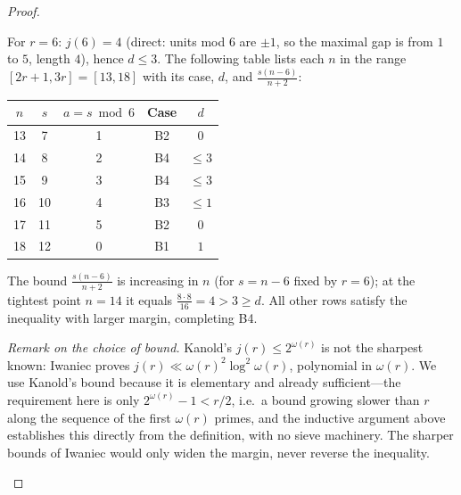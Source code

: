 \documentclass[11pt]{article}
\theoremstyle{definition}
\begin{document}
\begin{proof}
\begin{itemize}
  For $r=6$: $j(6)=4$ (direct: units mod 6 are $\pm1$, so the maximal
  gap is from $1$ to $5$, length $4$), hence $d\le3$. The following table
  lists each $n$ in the range $[2r+1,3r]=[13,18]$ with its case, $d$,
  and $\frac{s(n-6)}{n+2}$:
  \begin{center}
  \small
  \begin{tabular}{ccccc}
  \toprule
  $n$ & $s$ & $a=s\bmod6$ & Case & $d$ \\
  \midrule
  13 & 7  & 1 & B2 & $0$ \\
  14 & 8  & 2 & B4 & $\le3$ \\
  15 & 9  & 3 & B4 & $\le3$ \\
  16 & 10 & 4 & B3 & $\le1$ \\
  17 & 11 & 5 & B2 & $0$ \\
  18 & 12 & 0 & B1 & $1$ \\
  \bottomrule
  \end{tabular}
  \end{center}
  The bound $\frac{s(n-6)}{n+2}$ is increasing in $n$ (for $s=n-6$ fixed
  by $r=6$); at the tightest point $n=14$ it equals
  $\frac{8\cdot8}{16}=4>3\ge d$. All other rows satisfy the inequality
  with larger margin, completing B4.

  \emph{Remark on the choice of bound.} Kanold's $j(r)\le2^{\omega(r)}$
  is not the sharpest known: Iwaniec \cite{Iwaniec1978}
  proves $j(r)\ll\omega(r)^2\log^2\omega(r)$, polynomial in
  $\omega(r)$. We use Kanold's bound because it is elementary and
  already sufficient---the requirement here is only
  $2^{\omega(r)}-1<r/2$, i.e.\ a bound growing slower than $r$ along
  the sequence of the first $\omega(r)$ primes, and the inductive
  argument above establishes this directly from the definition, with
  no sieve machinery. The sharper bounds of Iwaniec would only widen
  the margin, never reverse the inequality.
\end{itemize}
\end{proof}
\end{document}
